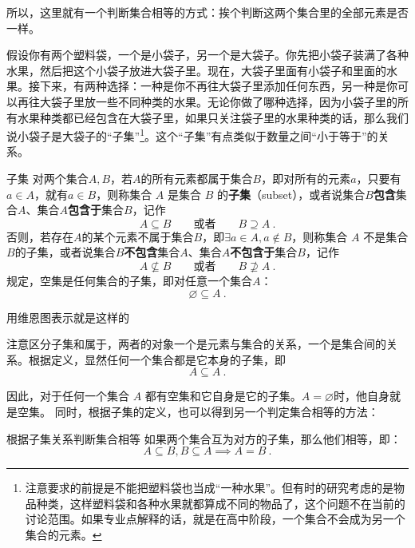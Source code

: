 所以，这里就有一个判断集合相等的方式：挨个判断这两个集合里的全部元素是否一样。

假设你有两个塑料袋，一个是小袋子，另一个是大袋子。你先把小袋子装满了各种水果，然后把这个小袋子放进大袋子里。现在，大袋子里面有小袋子和里面的水果。接下来，有两种选择：一种是你不再往大袋子里添加任何东西，另一种是你可以再往大袋子里放一些不同种类的水果。无论你做了哪种选择，因为小袋子里的所有水果种类都已经包含在大袋子里，如果只关注袋子里的水果种类的话，那么我们说小袋子是大袋子的“子集”\footnote{注意要求的前提是不能把塑料袋也当成“一种水果”。但有时的研究考虑的是物品种类，这样塑料袋和各种水果就都算成不同的物品了，这个问题不在当前的讨论范围。如果专业点解释的话，就是在高中阶段，一个集合不会成为另一个集合的元素。}。这个“子集”有点类似于数量之间“小于等于”的关系。

\begin{definition}{子集}\label{def_HsSet_3}
对两个集合$A,B$，若$A$的所有元素都属于集合$B$，即对所有的元素$a$，只要有$a\in A$，就有$a\in B$，则称集合 $A$ 是集合 $B$ 的\textbf{子集}（subset），或者说集合$B$\textbf{包含}集合$A$、集合$A$\textbf{包含于}集合$B$，记作
\begin{equation}
A \subseteq B\qquad\text{或者}\qquad B \supseteq A~.
\end{equation}
否则，若存在$A$的某个元素不属于集合$B$，即$\exists a\in A,a\notin B$，则称集合 $A$ 不是集合$B$的子集，或者说集合$B$\textbf{不包含}集合$A$、集合$A$\textbf{不包含于}集合$B$，记作
\begin{equation}
A \nsubseteq B\qquad\text{或者}\qquad B \nsupseteq A~.
\end{equation}
规定，空集是任何集合的子集，即对任意一个集合$A$：
\begin{equation}
\varnothing \subseteq A~.
\end{equation}
\end{definition}

用维恩图表示就是这样的

注意区分子集和属于，两者的对象一个是元素与集合的关系，一个是集合间的关系。根据定义，显然任何一个集合都是它本身的子集，即
\begin{equation}
A \subseteq A~.
\end{equation}

因此，对于任何一个集合 $A$ 都有空集和它自身是它的子集。$A=\varnothing$时，他自身就是空集。
同时，根据子集的定义，也可以得到另一个判定集合相等的方法：

\begin{theorem}{根据子集关系判断集合相等}
如果两个集合互为对方的子集，那么他们相等，即：
\begin{equation}\label{eq_HsSet_1}
A\subseteq B,B\subseteq A\implies A=B~.
\end{equation}
\end{theorem}

